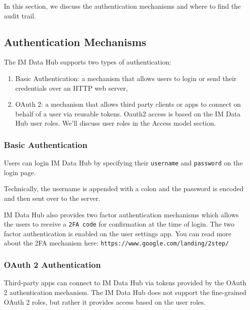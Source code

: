\documentclass[]{book}
\providecommand{\tightlist}{%
  \setlength{\itemsep}{0pt}\setlength{\parskip}{0pt}}
\begin{document}
In this section, we discuss the authentication mechanisms and where to find the audit trail.

\hypertarget{authentication-mechanisms}{%
\subsection{Authentication Mechanisms}\label{authentication-mechanisms}}

The IM Data Hub supports two types of authentication:

\begin{enumerate}
\def\labelenumi{\arabic{enumi}.}
\tightlist
\item
  Basic Authentication: a mechanism that allows users to login or send their credentials over an HTTP web server,
\item
  OAuth 2: a mechanism that allows third party clients or apps to connect on behalf of a user via reusable tokens. Oauth2 access is based on the IM Data Hub user roles. We'll discuss user roles in the Access model section.
\end{enumerate}

\hypertarget{basic-authentication}{%
\subsubsection{Basic Authentication}\label{basic-authentication}}

Users can login IM Data Hub by specifying their \texttt{username} and \texttt{password} on the login page.

Technically, the username is appended with a colon and the password is encoded and then sent over to the server.

IM Data Hub also provides two factor authentication mechanisms which allows the users to receive a \texttt{2FA\ code} for confirmation at the time of login. The two factor authentication is enabled on the user settings app. You can read more about the 2FA mechanism here: \texttt{https://www.google.com/landing/2step/}

\hypertarget{oauth-2-authentication}{%
\subsubsection{OAuth 2 Authentication}\label{oauth-2-authentication}}

Third-party apps can connect to IM Data Hub via tokens provided by the OAuth 2 authentication mechanism. The IM Data Hub does not support the fine-grained OAuth 2 roles, but rather it provides access based on the user roles.
\end{document}
